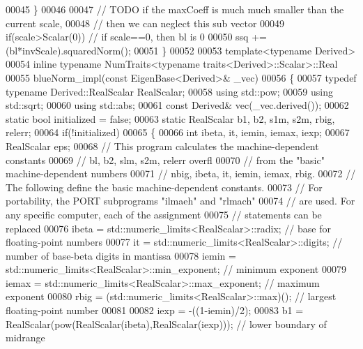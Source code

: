 \begin{DoxyCode}
00045   \}
00046   
00047   \textcolor{comment}{// TODO if the maxCoeff is much much smaller than the current scale,}
00048   \textcolor{comment}{// then we can neglect this sub vector}
00049   \textcolor{keywordflow}{if}(scale>Scalar(0)) \textcolor{comment}{// if scale==0, then bl is 0 }
00050     ssq += (bl*invScale).squaredNorm();
00051 \}
00052 
00053 \textcolor{keyword}{template}<\textcolor{keyword}{typename} Derived>
00054 \textcolor{keyword}{inline} \textcolor{keyword}{typename} NumTraits<typename traits<Derived>::Scalar>::Real
00055 blueNorm\_impl(\textcolor{keyword}{const} EigenBase<Derived>& \_vec)
00056 \{
00057   \textcolor{keyword}{typedef} \textcolor{keyword}{typename} Derived::RealScalar RealScalar;  
00058   \textcolor{keyword}{using} std::pow;
00059   \textcolor{keyword}{using} std::sqrt;
00060   \textcolor{keyword}{using} std::abs;
00061   \textcolor{keyword}{const} Derived& vec(\_vec.derived());
00062   \textcolor{keyword}{static} \textcolor{keywordtype}{bool} initialized = \textcolor{keyword}{false};
00063   \textcolor{keyword}{static} RealScalar b1, b2, s1m, s2m, rbig, relerr;
00064   \textcolor{keywordflow}{if}(!initialized)
00065   \{
00066     \textcolor{keywordtype}{int} ibeta, it, iemin, iemax, iexp;
00067     RealScalar eps;
00068     \textcolor{comment}{// This program calculates the machine-dependent constants}
00069     \textcolor{comment}{// bl, b2, slm, s2m, relerr overfl}
00070     \textcolor{comment}{// from the "basic" machine-dependent numbers}
00071     \textcolor{comment}{// nbig, ibeta, it, iemin, iemax, rbig.}
00072     \textcolor{comment}{// The following define the basic machine-dependent constants.}
00073     \textcolor{comment}{// For portability, the PORT subprograms "ilmaeh" and "rlmach"}
00074     \textcolor{comment}{// are used. For any specific computer, each of the assignment}
00075     \textcolor{comment}{// statements can be replaced}
00076     ibeta = std::numeric\_limits<RealScalar>::radix;                 \textcolor{comment}{// base for floating-point numbers}
00077     it    = std::numeric\_limits<RealScalar>::digits;                \textcolor{comment}{// number of base-beta digits in
       mantissa}
00078     iemin = std::numeric\_limits<RealScalar>::min\_exponent;          \textcolor{comment}{// minimum exponent}
00079     iemax = std::numeric\_limits<RealScalar>::max\_exponent;          \textcolor{comment}{// maximum exponent}
00080     rbig  = (std::numeric\_limits<RealScalar>::max)();               \textcolor{comment}{// largest floating-point number}
00081 
00082     iexp  = -((1-iemin)/2);
00083     b1    = RealScalar(pow(RealScalar(ibeta),RealScalar(iexp)));    \textcolor{comment}{// lower boundary of midrange}

\end{DoxyCode}
